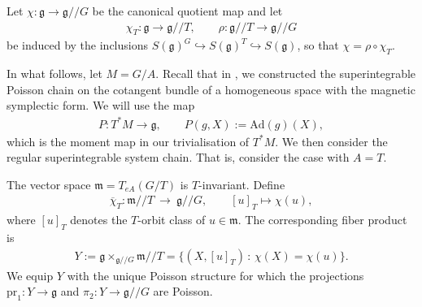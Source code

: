 \documentclass[11pt,reqno]{amsart}
\newtheorem*{theorem A}{Main Theorem A}
\newtheorem*{theorem B}{Main Theorem B}
\newtheorem*{theorem C}{Main Theorem C}
\newtheorem*{theorem D}{Main Theorem D}
\theoremstyle{definition}
\theoremstyle{plain}
\theoremstyle{conclusion}
\begin{document}
 

Let $\chi:\mathfrak{g}\to \mathfrak{g}//G$ be the canonical quotient map and let
\begin{align*}
\chi_T:\mathfrak{g} \longrightarrow  \mathfrak{g}//T ,\qquad \rho:\mathfrak{g}//T \longrightarrow  \mathfrak{g}//G
\end{align*}
be induced by the inclusions $S(\mathfrak{g})^G\hookrightarrow S(\mathfrak{g})^T \hookrightarrow S(\mathfrak{g})$, so that $\chi = \rho\circ \chi_T$. 

In what follows, let $M = G/A$. Recall that in \cite{jiang2026poisson}, we constructed the superintegrable Poisson chain on the cotangent bundle of a homogeneous space with the magnetic symplectic form. We will use the map \begin{align*}
P:T^*M\longrightarrow \mathfrak{g},\qquad  P(g,X):=\mathrm{Ad}(g)(X),
\end{align*} which is the moment map in our trivialisation of $T^*M$. We then consider the regular superintegrable system chain. That is, consider the case with $A = T$.

The vector space $\mathfrak{m} = T_{eA}(G/T)$ is $T$-invariant. Define
\begin{align*}
\overline \chi_T:\mathfrak{m}//T\ \longrightarrow\ \mathfrak{g}//G,\qquad [u]_T\longmapsto \chi(u),
\end{align*}
where $[u]_T$ denotes the $T$-orbit class of $u\in \mathfrak{m}$. The corresponding fiber product is
\begin{align*}
Y := \mathfrak{g} \times_{\mathfrak{g}//G}\mathfrak{m}//T
= \{(X,[u]_T)\, :\, \chi(X)=\chi(u)\}.
\end{align*}
We equip $Y$ with the unique Poisson structure for which the projections $\mathrm{pr}_1:Y\to \mathfrak{g}$ and $\pi_2:Y\to \mathfrak{g}//G$ are Poisson.
\end{document}
